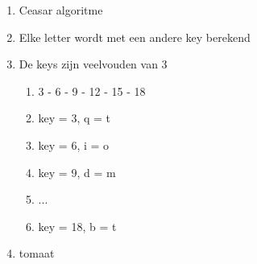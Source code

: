 \begin{enumerate}
  \item Ceasar algoritme
  \item Elke letter wordt met een andere key berekend
  \item De keys zijn veelvouden van 3
  \begin{enumerate}
  \item 3 - 6 - 9 - 12 - 15 - 18
  \item key = 3, q = t
  \item key = 6, i = o
  \item key = 9, d = m
  \item ...
  \item key = 18, b = t
  \end{enumerate} 
  \item tomaat   
\end{enumerate}
